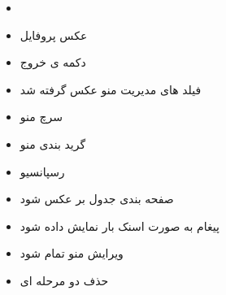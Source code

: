 \documentclass[12pt]{article}
\begin{document}
\begin{itemize}
	\item {}
	\item عکس پروفایل
	\item دکمه ی خروج
	\item فیلد های مدیریت منو عکس گرفته شد
	\qquad \checkmark 
	\item سرچ منو
	\item گرید بندی منو
	\item رسپانسیو
	\item صفحه بندی جدول بر عکس شود
	\item پیغام به صورت اسنک بار نمایش داده شود
	\item ویرایش منو تمام شود
	\item حذف دو مرحله ای
\end{itemize}
\end{document}
